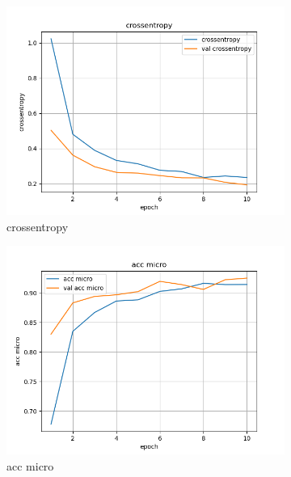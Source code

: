 \begin{figure}[ht]
    \centering
    \begin{subfigure}{0.32\textwidth}
        \centering
        \includegraphics[width=\linewidth]{../logs/resnet_img256_0/crossentropy.png}
        \caption{crossentropy}
    \end{subfigure}
    \begin{subfigure}{0.32\textwidth}
        \centering
        \includegraphics[width=\linewidth]{../logs/resnet_img256_0/acc micro.png}
        \caption{acc micro}
    \end{subfigure}
    \begin{subfigure}{0.32\textwidth}
        \centering

\end{subfigure}
\end{figure}
